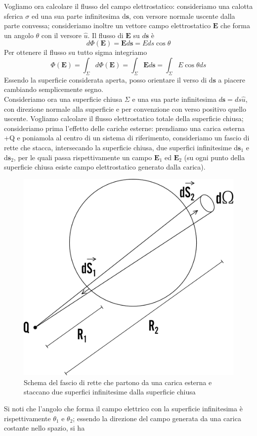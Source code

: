 \documentclass[
10pt, %
a4paper, %
oneside, %
headinclude,footinclude, %
BCOR5mm, %
]{scrartcl}
\begin{document}
Vogliamo ora calcolare il flusso del campo elettrostatico: consideriamo una calotta sferica \(\sigma\) ed una sua parte infinitesima d$\mathbf{s}$, con versore normale uscente dalla parte convessa; consideriamo inoltre un vettore campo elettrostatico $\mathbf{E}$ che forma un angolo \(\theta\) con il versore $\hat{u}$. Il flusso di $\mathbf{E}$ su \(d\mathbf{s}\) è 
\[d\Phi(\mathbf{E}) = \mathbf{E}d\mathbf{s} = Eds\cos\theta\]
Per ottenere il flusso su tutto sigma integriamo 
\[\Phi(\mathbf{E}) = \int_{\Sigma}d\Phi(\mathbf{E}) = \int_{\Sigma}\mathbf{E}d\mathbf{s} = \int_{\Sigma}E\cos\theta ds\]
Essendo la superficie considerata aperta, posso orientare il verso di d$\mathbf{s}$ a piacere cambiando semplicemente segno.\\
Consideriamo ora una superficie chiusa $\Sigma$ e una sua parte infinitesima $d\mathbf{s} = ds \hat{u}$, con direzione normale alla superficie e per convenzione con verso positivo quello uscente. Vogliamo calcolare il flusso elettrostatico totale della superficie chiusa; consideriamo prima l'effetto delle cariche esterne: prendiamo una carica esterna +Q e poniamola al centro di un sistema di riferimento, consideriamo un fascio di rette che stacca, intersecando la superficie chiusa, due superfici infinitesime d$\mathbf{s}_1$ e d$\mathbf{s}_2$, per le quali passa rispettivamente un campo $\mathbf{E}_1$ ed $\mathbf{E}_2$ (su ogni punto della superficie chiusa esiste campo elettrostatico generato dalla carica).  
\begin{figure}[h!]
	\centering
	\includegraphics[width=0.5\linewidth]{images/thm_gauss_1}
	\caption{Schema del fascio di rette che partono da una carica esterna e staccano due superfici infinitesime dalla superficie chiusa}
	\label{fig:thmgauss1}
\end{figure}
\FloatBarrier
Si noti che l'angolo che forma il campo elettrico con la superficie infinitesima è rispettivamente \(\theta_1\) e \(\theta_2\); essendo la direzione del campo generata da una carica costante nello spazio, si ha
\end{document}

